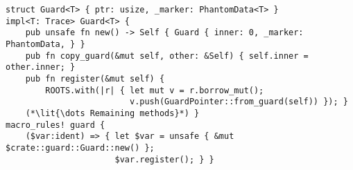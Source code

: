 \begin{lstlisting}[style=Rust,
caption=Excerpt of \mc{Guard}s definitions,label=lst:guard-impl]
struct Guard<T> { ptr: usize, _marker: PhantomData<T> }
impl<T: Trace> Guard<T> {
    pub unsafe fn new() -> Self { Guard { inner: 0, _marker: PhantomData, } }
    pub fn copy_guard(&mut self, other: &Self) { self.inner = other.inner; }
    pub fn register(&mut self) {
        ROOTS.with(|r| { let mut v = r.borrow_mut();
                         v.push(GuardPointer::from_guard(self)) }); }
    (*\lit{\dots Remaining methods}*) }
macro_rules! guard {
    ($var:ident) => { let $var = unsafe { &mut $crate::guard::Guard::new() };
                      $var.register(); } }\end{lstlisting}
